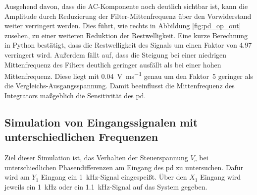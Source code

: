 \documentclass[../main.tex]{subfiles}
\begin{document}
\medskip
Ausgehend davon, dass die AC-Komponente noch deutlich sichtbar ist, kann die Amplitude durch Reduzierung der Filter-Mittenfrequenz über den Vorwiderstand weiter verringert werden. Dies führt, wie rechts in Abbildung \ref{fig:pd_op_out} zusehen, zu einer weiteren Reduktion der Restwelligkeit. Eine kurze Berechnung in Python bestätigt, dass die Restwelligkeit des Signals um einen Faktor von \num{4.97} verringert wird. Außerdem fällt auf, dass die Steigung bei einer niedrigen Mittenfrequenz des Filters deutlich geringer ausfällt als bei einer hohen Mittenfrequenz. Diese liegt mit \SI{0.04}{\volt\per\milli\second} genau um den Faktor~\num{5} geringer als die Vergleichs-Ausgangsspannung. Damit beeinflusst die Mittenfrequenz des Integrators maßgeblich die Sensitivität des \gls{pd}.\par
\medskip



\subsection{Simulation von Eingangssignalen mit unterschiedlichen Frequenzen}
\label{sec:theorie_pd}
Ziel dieser Simulation ist, das Verhalten der Steuerspannung $V_c$ bei unterschiedlichen Phasendifferenzen am Eingang des \gls{pd} zu untersuchen. Dafür wird am $Y_1$ Eingang ein \SI{1}{\kilo\hertz}-Signal eingespeißt. Über den $X_1$ Eingang wird jeweils ein \SI{1}{\kilo\hertz} oder ein \SI{1.1}{\kilo\hertz}-Signal auf das System gegeben.\par
\medskip
\end{document}
